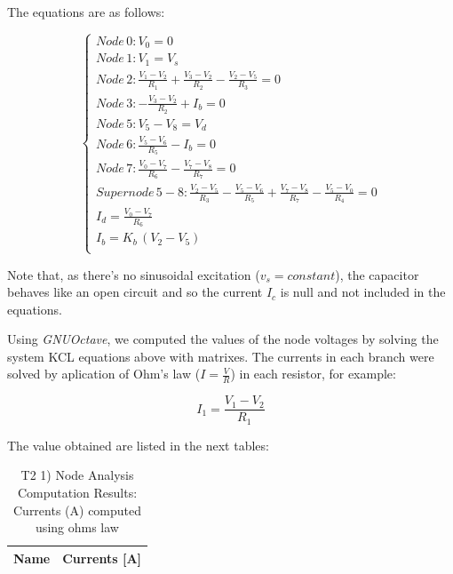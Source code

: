 The equations are as follows:

\begin{equation} 
\begin{cases}

    Node\, 0: V_0 = 0 \\
    Node\, 1: V_1 = V_s \\
    Node\, 2: \frac{V_1 - V_2}{R_1} + \frac{V_3 - V_2}{R_2} - \frac{V_2 - V_5}{R_3} = 0 \\
    Node\, 3: -\frac{V_3 - V_2}{R_2} + I_b = 0 \\
    Node\, 5: V_5 - V_8 = V_d \\
    Node\, 6: \frac{V_5 - V_6}{R_5} - I_b = 0 \\
    Node\, 7: \frac{V_0 - V_7}{R_6} - \frac{V_7 - V_8}{R_7} = 0 \\
    Supernode\, 5-8: \frac{V_2 - V_5}{R_3} - \frac{V_5 - V_6}{R_5} + \frac{V_7 - V_8}{R_7} - \frac{V_5 - V_0}{R_4} = 0 \\
    I_d = \frac{V_0 - V_7}{R_6} \\
    I_b = K_b\,(V_2 - V_5) \\
    
\end{cases}
\label{eq:1}
\end{equation}


Note that, as there's no sinusoidal excitation ($v_s = constant$), the capacitor behaves like an open circuit and so the current $I_c$ is null and not included in the equations.


Using \textit{GNUOctave}, we computed the values of the node voltages by solving the system KCL equations above with matrixes. The currents in each branch were solved by aplication of Ohm's law ($I = \frac{V}{R}$) in each resistor, for example:

\begin{center}
  \begin{equation}
    I_1 = \frac{V_1 - V_2}{R_1}
  \end{equation} 
\end{center}


The value obtained are listed in the next tables:

\begin{table}[h]
  \centering
  \begin{tabular}{|l|r|}
    \hline    
    {\bf Name} & {\bf Currents [A]} \\ \hline
    
  \end{tabular}
  \caption{T2 1) Node Analysis Computation Results: Currents (A) computed using ohms law}
  \label{tab:nodeCurrents1}
\end{table}


